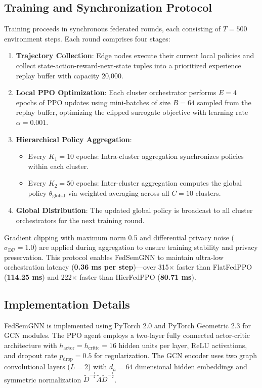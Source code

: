\subsection{Training and Synchronization Protocol}
Training proceeds in synchronous federated rounds, each consisting of $T = 500$ environment steps. Each round comprises four stages:
\begin{enumerate}
	\item \textbf{Trajectory Collection}: Edge nodes execute their current local policies and collect state-action-reward-next-state tuples into a prioritized experience replay buffer with capacity 20,000.
	\item \textbf{Local PPO Optimization}: Each cluster orchestrator performs $E = 4$ epochs of PPO updates using mini-batches of size $B = 64$ sampled from the replay buffer, optimizing the clipped surrogate objective with learning rate $\alpha = 0.001$.
	\item \textbf{Hierarchical Policy Aggregation}: 
	\begin{itemize}
		\item Every $K_1 = 10$ epochs: Intra-cluster aggregation synchronizes policies within each cluster.
		\item Every $K_2 = 50$ epochs: Inter-cluster aggregation computes the global policy $\theta_{\text{global}}$ via weighted averaging across all $C = 10$ clusters.
	\end{itemize}
	\item \textbf{Global Distribution}: The updated global policy is broadcast to all cluster orchestrators for the next training round.
\end{enumerate}

Gradient clipping with maximum norm 0.5 and differential privacy noise ($\sigma_{\text{DP}} = 1.0$) are applied during aggregation to ensure training stability and privacy preservation. This protocol enables FedSemGNN to maintain ultra-low orchestration latency (\textbf{0.36 ms per step})—over 315$\times$ faster than FlatFedPPO (\textbf{114.25 ms}) and 222$\times$ faster than HierFedPPO (\textbf{80.71 ms}).

\subsection{Implementation Details}
FedSemGNN is implemented using PyTorch 2.0 and PyTorch Geometric 2.3 for GCN modules. The PPO agent employs a two-layer fully connected actor-critic architecture with $h_{\text{actor}} = h_{\text{critic}} = 16$ hidden units per layer, ReLU activations, and dropout rate $p_{\text{drop}} = 0.5$ for regularization. The GCN encoder uses two graph convolutional layers ($L = 2$) with $d_h = 64$ dimensional hidden embeddings and symmetric normalization $\tilde{D}^{-\frac{1}{2}} \tilde{A} \tilde{D}^{-\frac{1}{2}}$.

